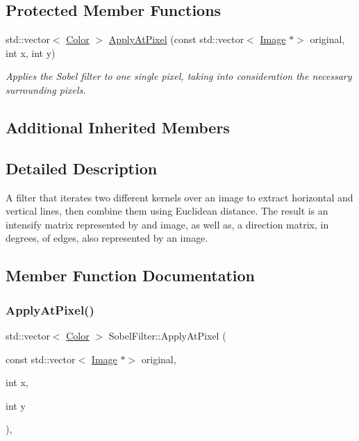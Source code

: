 \subsection*{Protected Member Functions}
\begin{DoxyCompactItemize}
\item 
std\+::vector$<$ \hyperlink{classColor}{Color} $>$ \hyperlink{classSobelFilter_a7ce32ba94d87a008e7344863c442a1bb}{Apply\+At\+Pixel} (const std\+::vector$<$ \hyperlink{classImage}{Image} $\ast$$>$ original, int x, int y)
\begin{DoxyCompactList}\small\item\em Applies the Sobel filter to one single pixel, taking into consideration the necessary surrounding pixels. \end{DoxyCompactList}\end{DoxyCompactItemize}
\subsection*{Additional Inherited Members}


\subsection{Detailed Description}
A filter that iterates two different kernels over an image to extract horizontal and vertical lines, then combine them using Euclidean distance. The result is an intensify matrix represented by and image, as well as, a direction matrix, in degrees, of edges, also represented by an image. 

\subsection{Member Function Documentation}
\mbox{\label{classSobelFilter_a7ce32ba94d87a008e7344863c442a1bb}} 
\subsubsection{\texorpdfstring{Apply\+At\+Pixel()}{ApplyAtPixel()}}
{\footnotesize\ttfamily std\+::vector$<$ \hyperlink{classColor}{Color} $>$ Sobel\+Filter\+::\+Apply\+At\+Pixel (\begin{DoxyParamCaption}\item[{const std\+::vector$<$ \hyperlink{classImage}{Image} $\ast$$>$}]{original,  }\item[{int}]{x,  }\item[{int}]{y }\end{DoxyParamCaption})\hspace{0.3cm}{\ttfamily [protected]}, {\ttfamily [virtual]}}



